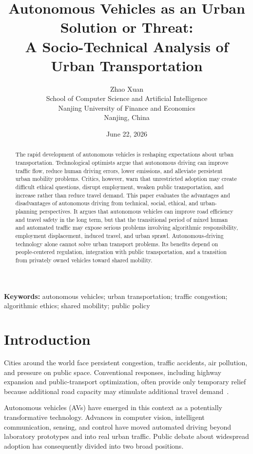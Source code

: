 \documentclass[12pt,a4paper]{article}
\title{Autonomous Vehicles as an Urban Solution or Threat:\\
A Socio-Technical Analysis of Urban Transportation}
\author{Zhao Xuan\\
School of Computer Science and Artificial Intelligence\\
Nanjing University of Finance and Economics\\
Nanjing, China}
\date{June 22, 2026}
\begin{document}
\maketitle

\begin{abstract}
The rapid development of autonomous vehicles is reshaping expectations about urban transportation. Technological optimists argue that autonomous driving can improve traffic flow, reduce human driving errors, lower emissions, and alleviate persistent urban mobility problems. Critics, however, warn that unrestricted adoption may create difficult ethical questions, disrupt employment, weaken public transportation, and increase rather than reduce travel demand. This paper evaluates the advantages and disadvantages of autonomous driving from technical, social, ethical, and urban-planning perspectives. It argues that autonomous vehicles can improve road efficiency and travel safety in the long term, but that the transitional period of mixed human and automated traffic may expose serious problems involving algorithmic responsibility, employment displacement, induced travel, and urban sprawl. Autonomous-driving technology alone cannot solve urban transport problems. Its benefits depend on people-centered regulation, integration with public transportation, and a transition from privately owned vehicles toward shared mobility.
\end{abstract}

\noindent\textbf{Keywords:} autonomous vehicles; urban transportation; traffic congestion; algorithmic ethics; shared mobility; public policy

\section{Introduction}

Cities around the world face persistent congestion, traffic accidents, air pollution, and pressure on public space. Conventional responses, including highway expansion and public-transport optimization, often provide only temporary relief because additional road capacity may stimulate additional travel demand~\citep{litman2020}.

Autonomous vehicles (AVs) have emerged in this context as a potentially transformative technology. Advances in computer vision, intelligent communication, sensing, and control have moved automated driving beyond laboratory prototypes and into real urban traffic. Public debate about widespread adoption has consequently divided into two broad positions.
\end{document}
